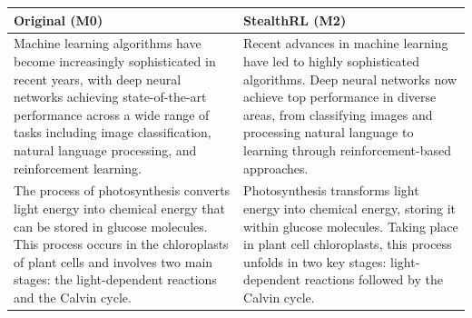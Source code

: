 \documentclass[11pt]{article}
\begin{document}
\begin{center}
\footnotesize
\setlength{\tabcolsep}{4pt}
\begin{tabularx}{\columnwidth}{>{\raggedright\arraybackslash}X >{\raggedright\arraybackslash}X}
\toprule
\textbf{Original (M0)} & \textbf{StealthRL (M2)} \\
\midrule
Machine learning algorithms have become increasingly sophisticated in recent years, with deep neural networks achieving state-of-the-art performance across a wide range of tasks including image classification, natural language processing, and reinforcement learning. &
Recent advances in machine learning have led to highly sophisticated algorithms. Deep neural networks now achieve top performance in diverse areas, from classifying images and processing natural language to learning through reinforcement-based approaches. \\
\midrule
The process of photosynthesis converts light energy into chemical energy that can be stored in glucose molecules. This process occurs in the chloroplasts of plant cells and involves two main stages: the light-dependent reactions and the Calvin cycle. &
Photosynthesis transforms light energy into chemical energy, storing it within glucose molecules. Taking place in plant cell chloroplasts, this process unfolds in two key stages: light-dependent reactions followed by the Calvin cycle. \\
\bottomrule
\end{tabularx}
\label{tab:qual2}
\end{center}
\end{document}
